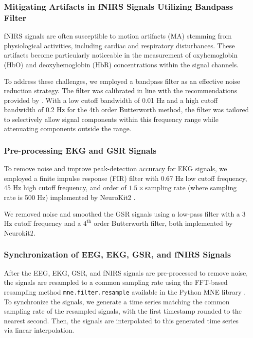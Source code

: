 \subsubsection{Mitigating Artifacts in fNIRS Signals Utilizing Bandpass Filter}

fNIRS signals are often susceptible to motion artifacts (MA) stemming from physiological activities, including cardiac and respiratory disturbances. These artifacts become particularly noticeable in the measurement of oxyhemoglobin (HbO) and deoxyhemoglobin (HbR) concentrations within the signal channels.

To address these challenges, we employed a bandpass filter as an effective noise reduction strategy. The filter was calibrated in line with the recommendations provided by \cite{Koenraadt2014}. With a low cutoff bandwidth of 0.01 Hz and a high cutoff bandwidth of 0.2 Hz for the 4th order Butterworth method, the filter was tailored to selectively allow signal components within this frequency range while attenuating components outside the range.

\subsubsection{Pre-processing EKG and GSR Signals}

To remove noise and improve peak-detection accuracy for EKG signals, we employed a finite impulse response (FIR) filter with 0.67 Hz low cutoff frequency, 45 Hz high cutoff frequency, and order of $1.5 \times \text{sampling rate}$ (where sampling rate is 500 Hz) implemented by NeuroKit2 \cite{Makowski2021neurokit}.

We removed noise and smoothed the GSR signals using a low-pass filter with a 3 Hz cutoff frequency and a $4^\text{th}$ order Butterworth filter, both implemented by Neurokit2.

\subsubsection{Synchronization of EEG, EKG, GSR, and fNIRS Signals}

After the EEG, EKG, GSR, and fNIRS signals are pre-processed to remove noise, the signals are resampled to a common sampling rate using the FFT-based resampling method \texttt{mne.filter.resample} available in the Python MNE library \cite{GramfortEtAl2013a}. To synchronize the signals, we generate a time series matching the common sampling rate of the resampled signals, with the first timestamp rounded to the nearest second. Then, the signals are interpolated to this generated time series via linear interpolation.

